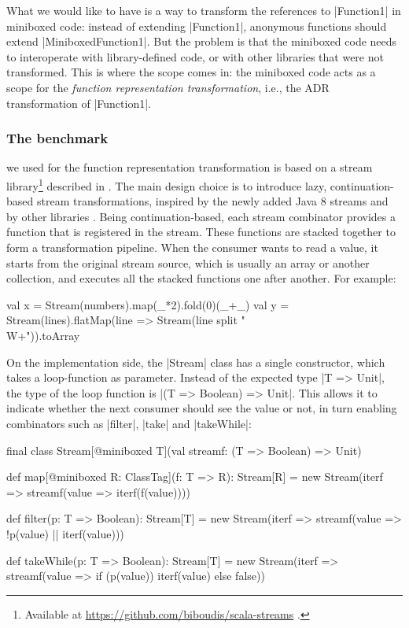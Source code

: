 What we would like to have is a way to transform the references to
|Function1| in miniboxed code: instead of extending |Function1|,
anonymous functions should extend |MiniboxedFunction1|. But the
problem is that the miniboxed code needs to interoperate with
library-defined code, or with other libraries that were not
transformed. This is where the scope comes in: the miniboxed code acts
as a scope for the \emph{function representation transformation},
i.e., the ADR transformation of |Function1|.

\subsubsection{The benchmark} we used for the function 
representation transformation is based on a stream
library\footnote{Available at
  \url{https://github.com/biboudis/scala-streams} .} described in
\cite{biboudis_clash_2014}. The main design choice is to introduce
lazy, continuation-based stream transformations, inspired by the newly
added Java 8 streams and by
other libraries \cite{nessos_streams}. Being continuation-based, each
stream combinator provides a function that is registered in the
stream. These functions are stacked together to form a transformation
pipeline. When the consumer wants to read a value, it starts from the
original stream source, which is usually an array or another
collection, and executes all the stacked functions one after
another. For example:

\begin{lstlisting-nobreak}
val x = Stream(numbers).map(_*2).fold(0)(_+_)
val y = Stream(lines).flatMap(line => Stream(line split "\\W+")).toArray
\end{lstlisting-nobreak}

On the implementation side, the |Stream| class has a single constructor, which takes a loop-function as parameter. Instead of the expected type |T => Unit|, the type of the loop function is |(T => Boolean) => Unit|. This allows it to indicate whether the next consumer should see the value or not, in turn enabling combinators such as |filter|, |take| and |takeWhile|:

\begin{lstlisting-nobreak}
final class Stream[@miniboxed T](val streamf: (T => Boolean) => Unit) {

  def map[@miniboxed R: ClassTag](f: T => R): Stream[R] =
    new Stream(iterf => streamf(value => iterf(f(value))))

  def filter(p: T => Boolean): Stream[T] =
    new Stream(iterf => streamf(value => !p(value) || iterf(value)))

  def takeWhile(p: T => Boolean): Stream[T] =
    new Stream(iterf => streamf(value => if (p(value)) iterf(value) else false))
}
\end{lstlisting-nobreak}

